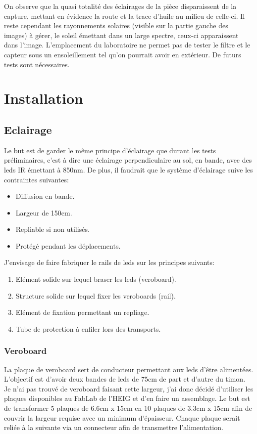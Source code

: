 On observe que la quasi totalité des éclairages de la pièce disparaissent de la capture,
mettant en évidence la route et la trace d'huile au milieu de celle-ci. Il reste cependant les rayonnements solaires (visible sur la partie gauche des images)
à gérer, le soleil émettant dans un large spectre, ceux-ci apparaissent dans l'image. L'emplacement du laboratoire ne permet pas de
tester le filtre et le capteur sous un ensoleillement tel qu'on pourrait avoir en extérieur. De futurs tests sont nécessaires.

\section{Installation}
\subsection{Eclairage}
Le but est de garder le même principe d'éclairage que durant les tests préliminaires, c'est à dire une éclairage perpendiculaire au sol,
en bande, avec des leds IR émettant à 850nm. De plus, il faudrait que le système d'éclairage suive les contraintes suivantes:
\begin{itemize}
    \item Diffusion en bande.
    \item Largeur de 150cm.
    \item Repliable si non utilisés.
    \item Protégé pendant les déplacements.
\end{itemize}
J'envisage de faire fabriquer le rails de leds sur les principes suivants:
\begin{enumerate}
    \item Elément solide sur lequel braser les leds (veroboard).
    \item Structure solide sur lequel fixer les veroboards (rail).
    \item Elément de fixation permettant un repliage.
    \item Tube de protection à enfiler lors des transports.
\end{enumerate}
\subsubsection{Veroboard}
La plaque de veroboard sert de conducteur permettant aux leds d'être alimentées. L'objectif est d'avoir deux bandes de leds de 75cm de part et d'autre
du timon. Je n'ai pas trouvé de veroboard faisant cette largeur, j'ai donc décidé d'utiliser les plaques disponibles au FabLab de l'HEIG et d'en faire un assemblage.
Le but est de transformer 5 plaques de 6.6cm x 15cm en 10 plaques de 3.3cm x 15cm afin de couvrir la largeur requise avec un minimum d'épaisseur.
Chaque plaque serait reliée à la suivante via un connecteur afin de transmettre l'alimentation.

